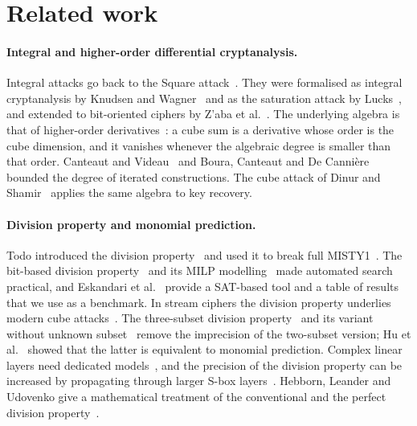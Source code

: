 \documentclass[pdflatex,sn-mathphys-num]{sn-jnl}
\theoremstyle{thmstyleone}
\theoremstyle{thmstylethree}
\theoremstyle{thmstyletwo}
\begin{document}
\section{Related work}\label{sec:related}

\paragraph{Integral and higher-order differential cryptanalysis.} Integral attacks go back to the Square attack~\cite{square1997}. They were formalised as integral cryptanalysis by Knudsen and Wagner~\cite{knudsen2002integral} and as the saturation attack by Lucks~\cite{lucks2001}, and extended to bit-oriented ciphers by Z'aba et al.~\cite{zaba2008}. The underlying algebra is that of higher-order derivatives~\cite{lai1994,knudsen1994}: a cube sum is a derivative whose order is the cube dimension, and it vanishes whenever the algebraic degree is smaller than that order. Canteaut and Videau~\cite{canteaut2002} and Boura, Canteaut and De Cannière~\cite{boura2011} bounded the degree of iterated constructions. The cube attack of Dinur and Shamir~\cite{dinur2009} applies the same algebra to key recovery.

\paragraph{Division property and monomial prediction.} Todo introduced the division property~\cite{todo2015} and used it to break full MISTY1~\cite{todo2015misty}. The bit-based division property~\cite{todo2016bit} and its MILP modelling~\cite{xiang2016milp} made automated search practical, and Eskandari et al.~\cite{eskandari2018} provide a SAT-based tool and a table of results that we use as a benchmark. In stream ciphers the division property underlies modern cube attacks~\cite{todo2017cube,wang2018cube}. The three-subset division property~\cite{huwang2019} and its variant without unknown subset~\cite{hao2020} remove the imprecision of the two-subset version; Hu et al.~\cite{hu2020mp} showed that the latter is equivalent to monomial prediction. Complex linear layers need dedicated models~\cite{hu2020linear,zhang2019}, and the precision of the division property can be increased by propagating through larger S-box layers~\cite{derbez2020}. Hebborn, Leander and Udovenko give a mathematical treatment of the conventional and the perfect division property~\cite{hebborn2023math}.
\end{document}
